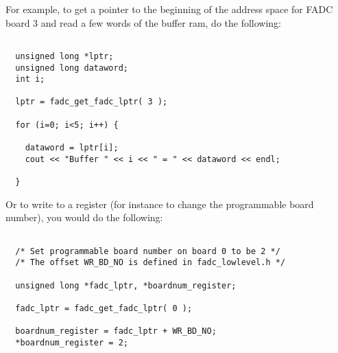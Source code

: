 \documentclass{article}
\begin{document}
For example, to get a pointer to the beginning of the address space
for FADC board 3 and read a few words of the buffer ram, do the
following:

\begin{verbatim}

  unsigned long *lptr;
  unsigned long dataword;
  int i;

  lptr = fadc_get_fadc_lptr( 3 );

  for (i=0; i<5; i++) {
    
    dataword = lptr[i];
    cout << "Buffer " << i << " = " << dataword << endl; 

  }

\end{verbatim}

Or to write to a register (for instance to change the programmable
board number), you would do the following:

\begin{verbatim}

  /* Set programmable board number on board 0 to be 2 */
  /* The offset WR_BD_NO is defined in fadc_lowlevel.h */

  unsigned long *fadc_lptr, *boardnum_register; 

  fadc_lptr = fadc_get_fadc_lptr( 0 );
  
  boardnum_register = fadc_lptr + WR_BD_NO;
  *boardnum_register = 2;

\end{verbatim}
\end{document}
